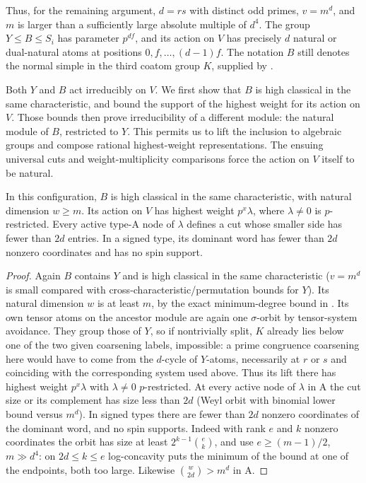 Thus, for the remaining argument, \(d=rs\) with distinct odd primes,
\(v=m^d\), and \(m\) is larger than a sufficiently large absolute multiple
of \(d^4\).  The group \(Y\le B\le S_i\) has parameter \(p^{df}\), and
its action on \(V\) has precisely \(d\) natural or dual-natural atoms at
positions \(0,f,\ldots,(d-1)f\).  The notation \(B\) still denotes the
normal simple in the third coatom group \(K\), supplied by
.

Both \(Y\) and \(B\) act irreducibly on \(V\). We first show that
\(B\) is high classical in the same characteristic, and bound the
support of the highest weight for its action on \(V\). Those bounds
then prove irreducibility of a different module: the natural module
of \(B\), restricted to \(Y\). This permits us to lift the inclusion
to algebraic groups and compose rational highest-weight
representations. The ensuing universal cuts and weight-multiplicity
comparisons force the action on \(V\) itself to be natural.

\begin{lemma}
\label{fb:sparse-weight}
In this configuration, \(B\) is high classical in the same characteristic,
with natural dimension \(w\ge m\).  Its action on \(V\) has highest
weight \(p^x\lambda\), where \(\lambda\ne0\) is \(p\)-restricted.
Every active type-A node of \(\lambda\) defines a cut whose smaller side
has fewer than \(2d\) entries.  In a signed type, its dominant word has
fewer than \(2d\) nonzero coordinates and has no spin support.
\end{lemma}
\begin{proof}

Again \(B\) contains \(Y\) and is high classical in the same characteristic (\(v=m^d\) is small compared with cross-characteristic/permutation bounds for \(Y\)). Its natural dimension \(w\) is at least \(m\), by the exact minimum-degree bound in . Its own tensor atoms on the ancestor module are again one \(\sigma\)-orbit by tensor-system avoidance. They group those of \(Y\), so if nontrivially split, \(K\) already lies below one of the two given coarsening labels, impossible: a prime congruence coarsening here would have to come from the \(d\)-cycle of \(Y\)-atoms, necessarily at \(r\) or \(s\) and coinciding with the corresponding system used above. Thus its lift there has highest weight \(p^x\lambda\) with \(\lambda\ne0\) \(p\)-restricted. At every active node of \(\lambda\) in A the cut size or its complement has size less than \(2d\) (Weyl orbit with binomial lower bound versus \(m^d\)). In signed types there are fewer than \(2d\) nonzero coordinates of the dominant word, and no spin supports. Indeed with rank \(e\) and \(k\) nonzero coordinates the orbit has size at least \(2^{k-1}\binom e k\), and use \(e\ge(m-1)/2\), \(m\gg d^4\): on \(2d\le k\le e\) log-concavity puts the minimum of the bound at one of the endpoints, both too large. Likewise \(\binom{w}{2d}>m^d\) in A.

\end{proof}

